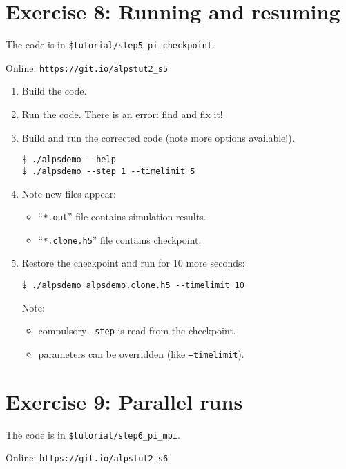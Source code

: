 \documentclass[12pt]{article}
\newcommand{\code}[1]{\texttt{#1}}
\begin{document}
\section{Exercise 8: Running and resuming}

The code is in \texttt{\color{ballblue}\$tutorial/step5\_pi\_checkpoint}.

Online: \nolinkurl{https://git.io/alpstut2_s5}

\begin{enumerate}
\item Build the code.
\item Run the code. There is an error: find and fix it!
\item Build and run the corrected code (note more options available!).
  \begin{lstlisting}
$ ./alpsdemo --help
$ ./alpsdemo --step 1 --timelimit 5
  \end{lstlisting}
\item Note new files appear:
  \begin{itemize}
  \item  ``\code{*.out}'' file contains simulation results.
  \item  ``\code{*.clone.h5}'' file contains checkpoint.
  \end{itemize}
\item Restore the checkpoint and run for 10 more seconds:
  \begin{lstlisting}
$ ./alpsdemo alpsdemo.clone.h5 --timelimit 10 
\end{lstlisting} %
Note:
  \begin{itemize}
  \item compulsory \code{--step} is read from the checkpoint.
  \item parameters can be overridden (like \code{--timelimit}).
  \end{itemize}
\end{enumerate}


\section{Exercise 9: Parallel runs}

The code is in \texttt{\color{ballblue}\$tutorial/step6\_pi\_mpi}.

Online: \nolinkurl{https://git.io/alpstut2_s6}
\end{document}
